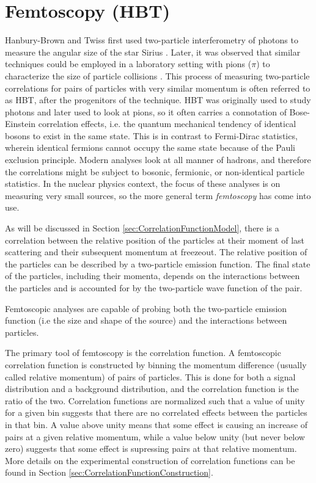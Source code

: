 \section{Femtoscopy (HBT)}
\label{sec:FemtoHBT}
Hanbury-Brown and Twiss first used two-particle interferometry of photons to measure the angular size of the star Sirius \cite{HanburyBrown:1956bqd}.
Later, it was observed that similar techniques could be employed in a laboratory setting with pions ($\pi$) to characterize the size of particle collisions \cite{Goldhaber:1960sf}.
This process of measuring two-particle correlations for pairs of particles with very similar momentum is often referred to as HBT, after the progenitors of the technique.
HBT was originally used to study photons and later used to look at pions, so it often carries a connotation of Bose-Einstein correlation effects, i.e. the quantum mechanical tendency of identical bosons to exist in the same state. This is in contrast to Fermi-Dirac statistics, wherein identical fermions cannot occupy the same state because of the Pauli exclusion principle.
Modern analyses look at all manner of hadrons, and therefore the correlations might be subject to bosonic, fermionic, or non-identical particle statistics.
In the nuclear physics context, the focus of these analyses is on measuring very small sources, so the more general term \textit{femtoscopy} has come into use.

As will be discussed in Section \ref{sec:CorrelationFunctionModel}, there is a correlation between the relative position of the particles at their moment of last scattering and their subsequent momentum at freezeout.
The relative position of the particles can be described by a two-particle emission function. The final state of the particles, including their momenta, depends on the interactions between the particles and is accounted for by the two-particle wave function of the pair.

Femtoscopic analyses are capable of probing both the two-particle emission function (i.e the size and shape of the source) and the interactions between particles. 

The primary tool of femtoscopy is the correlation function.
A femtoscopic correlation function is constructed by binning the momentum difference (usually called relative momentum) of pairs of particles.
This is done for both a signal distribution and a background distribution, and the correlation function is the ratio of the two.
Correlation functions are normalized such that a value of unity for a given bin suggests that there are no correlated effects between the particles in that bin.
A value above unity means that some effect is causing an increase of pairs at a given relative momentum, while a value below unity (but never below zero) suggests that some effect is supressing pairs at that relative momentum.
More details on the experimental construction of correlation functions can be found in Section \ref{sec:CorrelationFunctionConstruction}.

